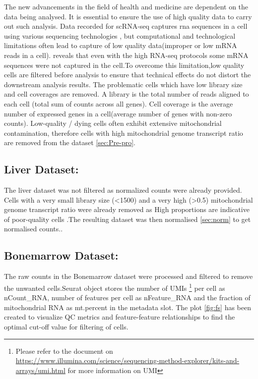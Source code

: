 \documentclass{sydneythesis}
\begin{document}
The new advancements in the field of health and medicine are dependent
on the data being analysed. It is essential to ensure the use of high
quality data to carry out such analysis. Data recorded for scRNA-seq
captures rna sequences in a cell using various sequencing technologies
\autocite{pareek2011sequencing}, but computational and technological
limitations often lead to capture of low quality data(improper or low
mRNA reads in a cell).\textcite{haque2017practical} reveals that even
with the high RNA-seq protocols some mRNA sequences were not captured in
the cell.To overcome this limitation,low quality cells are filtered
before analysis to ensure that technical effects do not distort the
downstream analysis results. The problematic cells which have low
library size and cell coverages are removed. A library is the total
number of reads aligned to each cell (total sum of counts across all
genes). Cell coverage is the average number of expressed genes in a
cell(average number of genes with non-zero counts). Low-quality / dying
cells often exhibit extensive mitochondrial contamination, therefore
cells with high mitochondrial genome transcript ratio are removed from
the dataset \ref{sec:Pre-pro}.

\subsection{Liver Dataset:}\label{liver-dataset}

The liver dataset was not filtered as normalized counts were already
provided. Cells with a very small library size (\textless{}1500) and a
very high (\textgreater{}0.5) mitochondrial genome transcript ratio were
already removed as High proportions are indicative of poor-quality cells
\autocite{ilicic2016classification} .The resulting dataset was then
normalised \ref{sec:norm} to get normalised
counts.\autocite[refer][]{macparland2018single}.

\subsection{Bonemarrow Dataset:}\label{bonemarrow-dataset}

The raw counts in the Bonemarrow dataset were processed and filtered to
remove the unwanted cells.Seurat object stores the number of UMIs
\footnote{Please refer to the document on  \url{https://www.illumina.com/science/sequencing-method-explorer/kits-and-arrays/umi.html} for more information on UMI}
\autocite{smith2017umi} per cell as nCount\_RNA, number of features per
cell as nFeature\_RNA and the fraction of mitochondrial RNA as
mt.percent in the metadata slot. The plot \ref{fig:fs} has been created
to visualize QC metrics and feature-feature relationships to find the
optimal cut-off value for filtering of cells.
\end{document}
